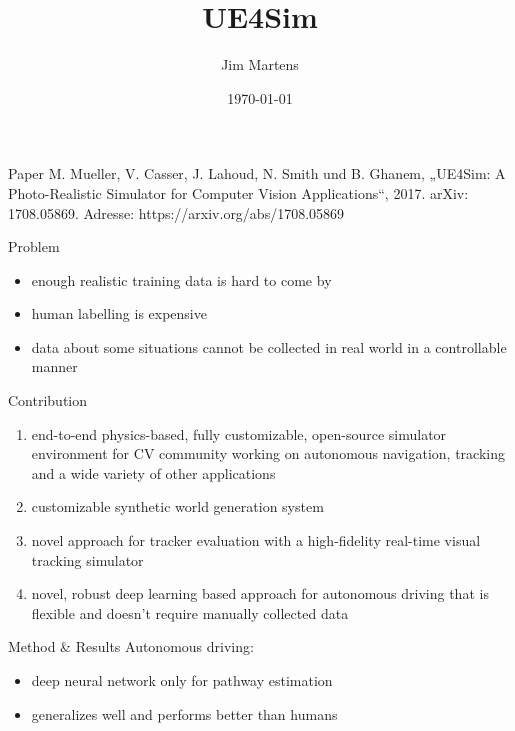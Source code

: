 \documentclass{beamer}
\begin{document}
\author{Jim Martens}
\title{UE4Sim}
\date{\today}

\begin{frame}
    \titlepage
\end{frame}

\begin{frame}{Paper}
    \centering
    M. Mueller, V. Casser, J. Lahoud, N. Smith und B. Ghanem,
    „UE4Sim: A Photo-Realistic Simulator for Computer Vision Applications“,
    2017. arXiv: 1708.05869. Adresse: https://arxiv.org/abs/1708.05869
\end{frame}

\begin{frame}{Problem}
    \begin{itemize}
        \item enough realistic training data is hard to come by
        \vfill
        \item human labelling is expensive
        \vfill
        \item data about some situations cannot be collected in real world
              in a controllable manner
    \end{itemize}
\end{frame}

\begin{frame}{Contribution}
    \begin{enumerate}
        \item end-to-end physics-based, fully customizable, open-source simulator
              environment for CV community working on autonomous navigation,
              tracking and a wide variety of other applications
        \vfill
        \item customizable synthetic world generation system
        \vfill
        \item novel approach for tracker evaluation with a high-fidelity real-time
              visual tracking simulator
        \vfill
        \item novel, robust deep learning based approach for autonomous driving
              that is flexible and doesn't require manually collected data
    \end{enumerate}
\end{frame}

\begin{frame}{Method \& Results}
    Autonomous driving:
    \begin{itemize}
        \item deep neural network only for pathway estimation
        \item generalizes well and performs better than humans
    \end{itemize}
\end{frame}
\end{document}

